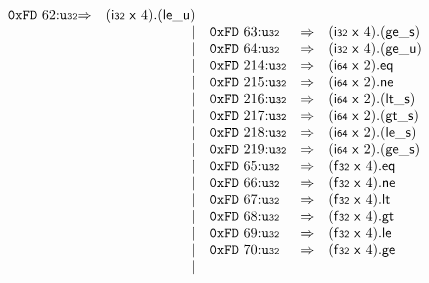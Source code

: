 $$\begin{array}{@{}l@{}rrlll@{}l@{}}
\mathtt{0xFD}~62{:}{\mathtt{u{\scriptstyle32}}} &\Rightarrow& (\mathsf{i{\scriptstyle32}}~\mathsf{x}~4) . ({\mathsf{le\_}}{\mathsf{u}}) \\ &&|&
\mathtt{0xFD}~63{:}{\mathtt{u{\scriptstyle32}}} &\Rightarrow& (\mathsf{i{\scriptstyle32}}~\mathsf{x}~4) . ({\mathsf{ge\_}}{\mathsf{s}}) \\ &&|&
\mathtt{0xFD}~64{:}{\mathtt{u{\scriptstyle32}}} &\Rightarrow& (\mathsf{i{\scriptstyle32}}~\mathsf{x}~4) . ({\mathsf{ge\_}}{\mathsf{u}}) \\ &&|&
\mathtt{0xFD}~214{:}{\mathtt{u{\scriptstyle32}}} &\Rightarrow& (\mathsf{i{\scriptstyle64}}~\mathsf{x}~2) . \mathsf{eq} \\ &&|&
\mathtt{0xFD}~215{:}{\mathtt{u{\scriptstyle32}}} &\Rightarrow& (\mathsf{i{\scriptstyle64}}~\mathsf{x}~2) . \mathsf{ne} \\ &&|&
\mathtt{0xFD}~216{:}{\mathtt{u{\scriptstyle32}}} &\Rightarrow& (\mathsf{i{\scriptstyle64}}~\mathsf{x}~2) . ({\mathsf{lt\_}}{\mathsf{s}}) \\ &&|&
\mathtt{0xFD}~217{:}{\mathtt{u{\scriptstyle32}}} &\Rightarrow& (\mathsf{i{\scriptstyle64}}~\mathsf{x}~2) . ({\mathsf{gt\_}}{\mathsf{s}}) \\ &&|&
\mathtt{0xFD}~218{:}{\mathtt{u{\scriptstyle32}}} &\Rightarrow& (\mathsf{i{\scriptstyle64}}~\mathsf{x}~2) . ({\mathsf{le\_}}{\mathsf{s}}) \\ &&|&
\mathtt{0xFD}~219{:}{\mathtt{u{\scriptstyle32}}} &\Rightarrow& (\mathsf{i{\scriptstyle64}}~\mathsf{x}~2) . ({\mathsf{ge\_}}{\mathsf{s}}) \\ &&|&
\mathtt{0xFD}~65{:}{\mathtt{u{\scriptstyle32}}} &\Rightarrow& (\mathsf{f{\scriptstyle32}}~\mathsf{x}~4) . \mathsf{eq} \\ &&|&
\mathtt{0xFD}~66{:}{\mathtt{u{\scriptstyle32}}} &\Rightarrow& (\mathsf{f{\scriptstyle32}}~\mathsf{x}~4) . \mathsf{ne} \\ &&|&
\mathtt{0xFD}~67{:}{\mathtt{u{\scriptstyle32}}} &\Rightarrow& (\mathsf{f{\scriptstyle32}}~\mathsf{x}~4) . \mathsf{lt} \\ &&|&
\mathtt{0xFD}~68{:}{\mathtt{u{\scriptstyle32}}} &\Rightarrow& (\mathsf{f{\scriptstyle32}}~\mathsf{x}~4) . \mathsf{gt} \\ &&|&
\mathtt{0xFD}~69{:}{\mathtt{u{\scriptstyle32}}} &\Rightarrow& (\mathsf{f{\scriptstyle32}}~\mathsf{x}~4) . \mathsf{le} \\ &&|&
\mathtt{0xFD}~70{:}{\mathtt{u{\scriptstyle32}}} &\Rightarrow& (\mathsf{f{\scriptstyle32}}~\mathsf{x}~4) . \mathsf{ge} \\ &&|&

\end{array}$$
